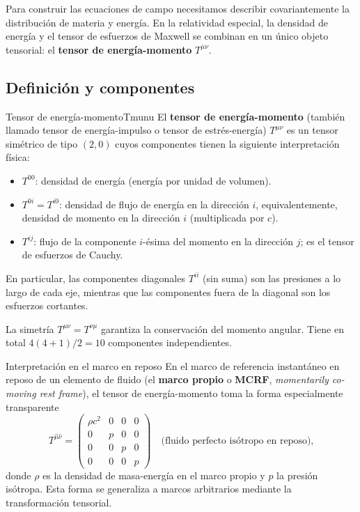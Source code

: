 Para construir las ecuaciones de campo necesitamos describir covariante\-mente la distribución de materia y energía. En la relatividad especial, la densidad de energía y el tensor de esfuerzos de Maxwell se combinan en un único objeto tensorial: el \textbf{tensor de energía-momento} $T^{\mu\nu}$.

\subsection{Definición y componentes}

\begin{definicion}{Tensor de energía-momento}{Tmunu}
El \textbf{tensor de energía-momento} (también llamado tensor de energía-impulso o tensor de estrés-energía) $T^{\mu\nu}$ es un tensor simétrico de tipo $(2,0)$ cuyos componentes tienen la siguiente interpretación física:
\begin{itemize}[leftmargin=2em]
  \item $T^{00}$: densidad de energía (energía por unidad de volumen).
  \item $T^{0i} = T^{i0}$: densidad de flujo de energía en la dirección $i$, equivalentemente, densidad de momento en la dirección $i$ (multiplicada por $c$).
  \item $T^{ij}$: flujo de la componente $i$-ésima del momento en la dirección $j$; es el tensor de esfuerzos de Cauchy.
\end{itemize}
En particular, las componentes diagonales $T^{ii}$ (sin suma) son las presiones a lo largo de cada eje, mientras que las componentes fuera de la diagonal son los esfuerzos cortantes.
\end{definicion}

La simetría $T^{\mu\nu} = T^{\nu\mu}$ garantiza la conservación del momento angular. Tiene en total $4(4+1)/2 = 10$ componentes independientes.

\begin{observacion}{Interpretación en el marco en reposo}{}
En el marco de referencia instantáneo en reposo de un elemento de fluido (el \textbf{marco propio} o \textbf{MCRF}, \emph{momentarily co-moving rest frame}), el tensor de energía-momento toma la forma especialmente transparente
\begin{equation}
  T^{\hat\mu\hat\nu} =
  \begin{pmatrix}
    \rho c^2 & 0 & 0 & 0 \\
    0 & p & 0 & 0 \\
    0 & 0 & p & 0 \\
    0 & 0 & 0 & p
  \end{pmatrix}
  \quad\text{(fluido perfecto isótropo en reposo),}
  \label{eq:Tmunu_MCRF}
\end{equation}
donde $\rho$ es la densidad de masa-energía en el marco propio y $p$ la presión isótropa. Esta forma se generaliza a marcos arbitrarios mediante la transformación tensorial.
\end{observacion}

